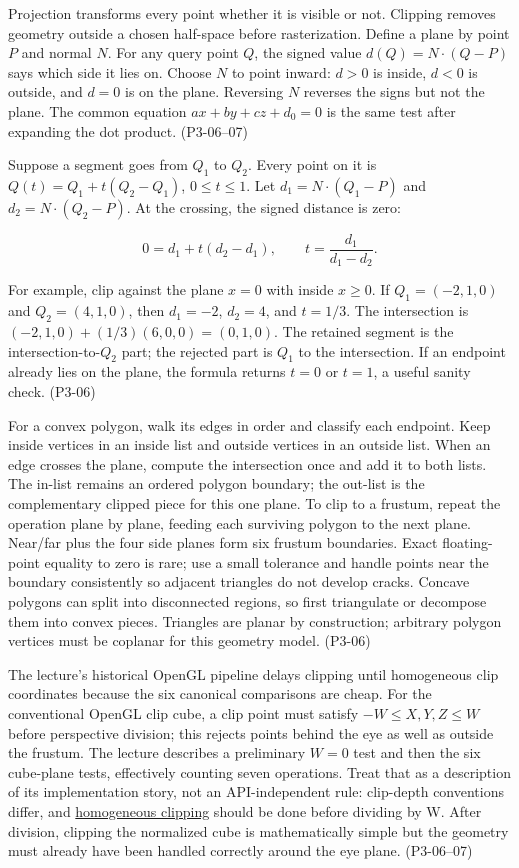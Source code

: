 \hypertarget{03-visual-computing-i-ch003-clipping-as-signed-distance-and-interpolation}{}

Projection transforms every point whether it is visible or not. Clipping removes geometry outside a chosen half-space before rasterization. Define a plane by point \(P\) and normal \(N\). For any query point \(Q\), the signed value \(d(Q)=N\cdot(Q-P)\) says which side it lies on. Choose \(N\) to point inward: \(d>0\) is inside, \(d<0\) is outside, and \(d=0\) is on the plane. Reversing \(N\) reverses the signs but not the plane. The common equation \(ax+by+cz+d_0=0\) is the same test after expanding the dot product. (P3-06--07)

Suppose a segment goes from \(Q_1\) to \(Q_2\). Every point on it is \(Q(t)=Q_1+t(Q_2-Q_1)\), \(0\le t\le1\). Let \(d_1=N\cdot(Q_1-P)\) and \(d_2=N\cdot(Q_2-P)\). At the crossing, the signed distance is zero:

\[
0=d_1+t(d_2-d_1),\qquad t=\frac{d_1}{d_1-d_2}.
\]

For example, clip against the plane \(x=0\) with inside \(x\ge0\). If \(Q_1=(-2,1,0)\) and \(Q_2=(4,1,0)\), then \(d_1=-2\), \(d_2=4\), and \(t=1/3\). The intersection is \((-2,1,0)+(1/3)(6,0,0)=(0,1,0)\). The retained segment is the intersection-to-\(Q_2\) part; the rejected part is \(Q_1\) to the intersection. If an endpoint already lies on the plane, the formula returns \(t=0\) or \(t=1\), a useful sanity check. (P3-06)

For a convex polygon, walk its edges in order and classify each endpoint. Keep inside vertices in an inside list and outside vertices in an outside list. When an edge crosses the plane, compute the intersection once and add it to both lists. The in-list remains an ordered polygon boundary; the out-list is the complementary clipped piece for this one plane. To clip to a frustum, repeat the operation plane by plane, feeding each surviving polygon to the next plane. Near/far plus the four side planes form six frustum boundaries. Exact floating-point equality to zero is rare; use a small tolerance and handle points near the boundary consistently so adjacent triangles do not develop cracks. Concave polygons can split into disconnected regions, so first triangulate or decompose them into convex pieces. Triangles are planar by construction; arbitrary polygon vertices must be coplanar for this geometry model. (P3-06)

The lecture's historical OpenGL pipeline delays clipping until homogeneous clip coordinates because the six canonical comparisons are cheap. For the conventional OpenGL clip cube, a clip point must satisfy \(-W\le X,Y,Z\le W\) before perspective division; this rejects points behind the eye as well as outside the frustum. The lecture describes a preliminary \(W=0\) test and then the six cube-plane tests, effectively counting seven operations. Treat that as a description of its implementation story, not an API-independent rule: clip-depth conventions differ, and \hyperref[appendix-40426e4b2103]{homogeneous clipping} should be done before dividing by W. After division, clipping the normalized cube is mathematically simple but the geometry must already have been handled correctly around the eye plane. (P3-06--07)

